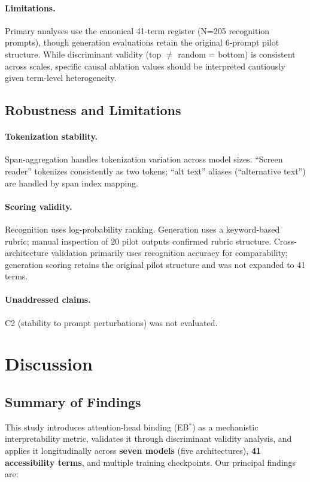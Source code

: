 \documentclass[10pt]{article} %
\begin{document}
\paragraph{Limitations.}
Primary analyses use the canonical 41-term register (N=205 recognition prompts), though generation evaluations retain the original 6-prompt pilot structure. While discriminant validity (top $\neq$ random = bottom) is consistent across scales, specific causal ablation values should be interpreted cautiously given term-level heterogeneity.

\subsection{Robustness and Limitations}

\paragraph{Tokenization stability.}
Span-aggregation handles tokenization variation across model sizes.
``Screen reader'' tokenizes consistently as two tokens; ``alt text'' aliases (``alternative text'') are handled by span index mapping.

\paragraph{Scoring validity.}
Recognition uses log-probability ranking.
Generation uses a keyword-based rubric; manual inspection of 20 pilot outputs confirmed rubric structure. Cross-architecture validation primarily uses recognition accuracy for comparability; generation scoring retains the original pilot structure and was not expanded to 41 terms.

\paragraph{Unaddressed claims.}
C2 (stability to prompt perturbations) was not evaluated.

\section{Discussion}

\subsection{Summary of Findings}

This study introduces attention-head binding (EB$^*$) as a mechanistic interpretability metric, validates it through discriminant validity analysis, and applies it longitudinally across \textbf{seven models} (five architectures), \textbf{41 accessibility terms}, and multiple training checkpoints.
Our principal findings are:
\end{document}
